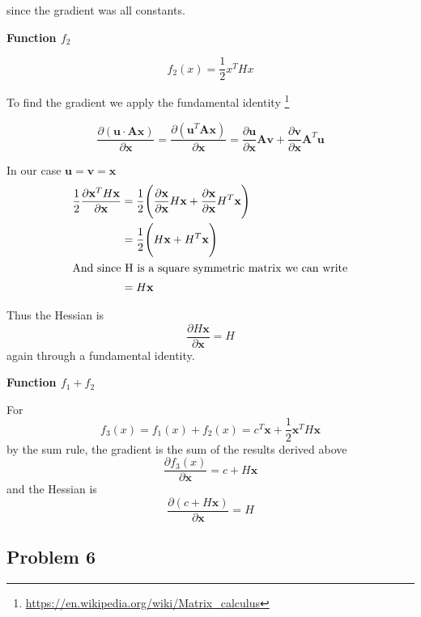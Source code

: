 since the gradient was all constants.

\textbf{Function $f_2$}


\[
f_2(x) = \frac{1}{2} x^T H x
\]

To find the gradient we apply the fundamental identity \footnote{\url{https://en.wikipedia.org/wiki/Matrix_calculus}} 

\[
\frac{\partial (\textbf{u} \cdot \textbf{A} \textbf{x}) }{\partial\textbf{x}} =
	\frac{\partial (\textbf{u}^T \textbf{A} \textbf{x}) }{\partial\textbf{x}} =
	\frac{\partial\textbf{u}}{\partial\textbf{x}} \textbf{A} \textbf{v} + \frac{\partial\textbf{v}}{\partial\textbf{x}} \textbf{A}^T \textbf{u}
\]

In our case $\textbf{u} = \textbf{v} = \textbf{x}$
\begin{align*}
\frac{1}{2} \frac{\partial \textbf{x}^T H \textbf{x}}{\partial \textbf{x}} &=
	\frac{1}{2} \Bigg( \frac{\partial\textbf{x}}{\partial\textbf{x}} H \textbf{x} + \frac{\partial\textbf{x}}{\partial\textbf{x}} H^T \textbf{x} \Bigg) \\
	&= \frac{1}{2} \Bigg( H\textbf{x} + H^T \textbf{x}\Bigg) \\
\intertext{And since H is a square symmetric matrix we can write}
	&= H\textbf{x}
\end{align*}

Thus the Hessian is
\[
\frac{\partial H \textbf{x}}{\partial \textbf{x}} = H
\]
again through a fundamental identity.

\textbf{Function $f_1 + f_2$}

For
\[
f_3(x) = f_1(x) + f_2(x) = c^T \textbf{x} + \frac{1}{2} \textbf{x}^T H \textbf{x}
\]
by the sum rule, the gradient is the sum of the results derived above
\[
\frac{\partial f_3(x)}{\partial \textbf{x}} = c + H \textbf{x}
\]
and the Hessian is
\[
\frac{\partial  (c + H \textbf{x})}{\partial \textbf{x}} = H
\]

\subsection{Problem 6 \color{green}{???}}

